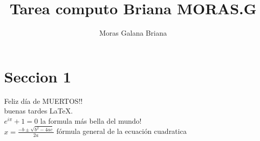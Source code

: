 \documentclass[a4paper,10pt]{article}
\title{Tarea computo Briana MORAS.G} %
\author{Moras Galana Briana } %
\begin{document}
\maketitle

% 

\section{Seccion 1}

Feliz día de MUERTOS!! \\ %

buenas tardes \LaTeX.\\ %

$ e^{i \pi} + 1 = 0 $ la formula más bella del mundo!\\ %



$ x = \frac {-b \pm \sqrt {b^2 - 4ac}}{2a} $   fórmula general de la ecuación cuadratica \\
\end{document}
